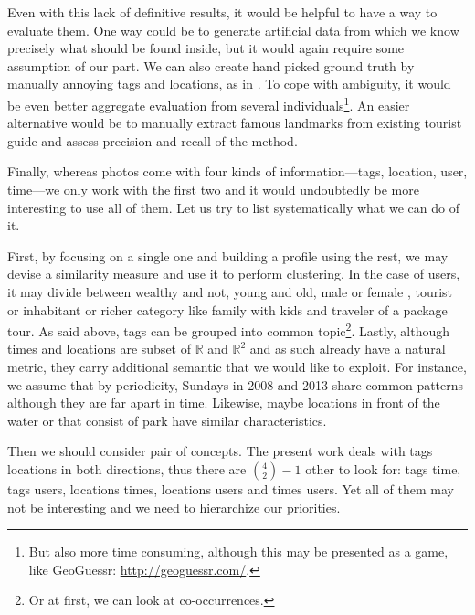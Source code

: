 Even with this lack of definitive results, it would be helpful to have a way
to evaluate them. One way could be to generate artificial data from which we
know precisely what should be found inside, but it would again require some
assumption of our part. We can also create hand picked ground truth by
manually annoying tags and locations, as in \cite{Rattenbury2009}. To cope
with ambiguity, it would be even better aggregate evaluation from several
individuals\footnote{But also more time consuming, although this may be
presented as a game, like GeoGuessr: \url{http://geoguessr.com/}.}. An easier
alternative would be to manually extract famous landmarks from existing
tourist guide and assess precision and recall of the method.

Finally, whereas photos come with four kinds of information---tags, location,
user, time---we only work with the first two and it would undoubtedly be more
interesting to use all of them. Let us try to list systematically what we can
do of it.

First, by focusing on a single one and building a profile using the rest, we
may devise a similarity measure and use it to perform clustering. In the case
of users, it may divide between wealthy and not, young and old, male or female
\cite{gender}, tourist or inhabitant or richer category like family with kids
and traveler of a package tour. As said above, tags can be grouped into common
topic\footnote{Or at first, we can look at co-occurrences.}. Lastly, although
times and locations are subset of $\mathbb{R}$ and $\mathbb{R}^2$ and as such
already have a natural metric, they carry additional semantic that we would
like to exploit. For instance, we assume that by periodicity, Sundays in 2008
and 2013 share common patterns although they are far apart in time. Likewise,
maybe locations in front of the water or that consist of park have similar
characteristics.

Then we should consider pair of concepts. The present work deals with tags
\texrel locations in both directions, thus there are $\binom{4}{2} - 1$ other
to look for: tags \texrel time, tags \texrel users, locations \texrel times,
locations \texrel users and times \texrel users. Yet all of them may not be
interesting and we need to hierarchize our priorities. 
